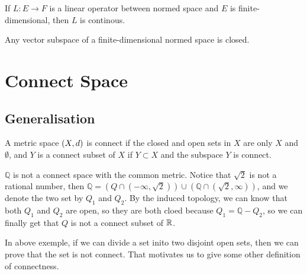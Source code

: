 \documentclass[en,hazy,black,noraml,12pt]{elegantnote}
\begin{document}
\begin{corollary}
    If \(L:E \to F\) is a linear operator between normed space and \(E\) is finite-dimensional, then \(L\) is continous.
\end{corollary}

\begin{corollary}
    Any vector subspace of a finite-dimensional normed space is closed.
\end{corollary}



\section{Connect Space}
\subsection{Generalisation}
\begin{definition}
    A metric space \((X,d)\) is connect if the closed and open sets in \(X\) are only \(X\) and \(\emptyset\), and \(Y\) is a connect subset of \(X\) if \(Y \subset X\) and the subspace \(Y\) is connect.

    \begin{example}
        \(\mathbb{Q}\) is not a connect space with the common metric. Notice that \(\sqrt{2}\) is not a rational number, then \(\mathbb{Q} = (Q \cap (-\infty,\sqrt{2})) \cup (\mathbb{Q} \cap (\sqrt{2},\infty))\), and we denote the two set by \(Q_1\) and \(Q_2\). By the induced topology, we can know that both \(Q_1\) and \(Q_2\) are open, so they are both cloed because \(Q_1 = \mathbb{Q}-Q_2\), so we can finally get that \(Q\) is not a connect subset of \(\mathbb{R}\).
    \end{example}
\end{definition}

In above exemple, if we can divide a set inito two disjoint open sets, then we can prove that the set is not connect. That motivates us to give some other definition of connectness.
\end{document}
